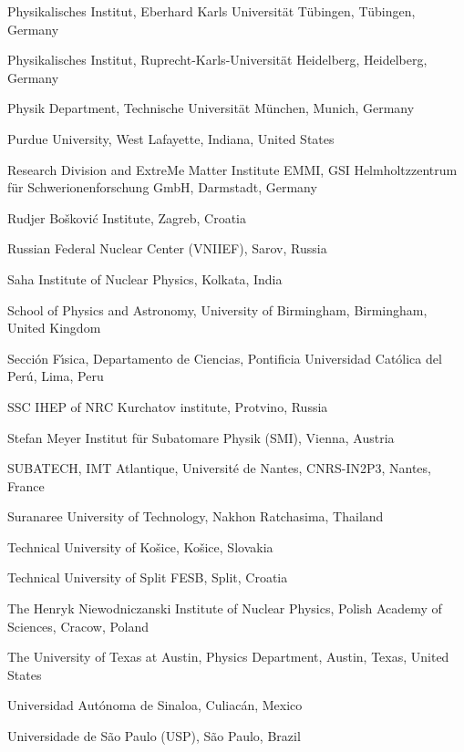 \begin{flushleft}
\begin{Authlist}
\item {}Physikalisches Institut, Eberhard Karls Universit\"{a}t T\"{u}bingen, T\"{u}bingen, Germany
\item {}Physikalisches Institut, Ruprecht-Karls-Universit\"{a}t Heidelberg, Heidelberg, Germany
\item {}Physik Department, Technische Universit\"{a}t M\"{u}nchen, Munich, Germany
\item {}Purdue University, West Lafayette, Indiana, United States
\item {}Research Division and ExtreMe Matter Institute EMMI, GSI Helmholtzzentrum f\"ur Schwerionenforschung GmbH, Darmstadt, Germany
\item {}Rudjer Bo\v{s}kovi\'{c} Institute, Zagreb, Croatia
\item {}Russian Federal Nuclear Center (VNIIEF), Sarov, Russia
\item {}Saha Institute of Nuclear Physics, Kolkata, India
\item {}School of Physics and Astronomy, University of Birmingham, Birmingham, United Kingdom
\item {}Secci\'{o}n F\'{\i}sica, Departamento de Ciencias, Pontificia Universidad Cat\'{o}lica del Per\'{u}, Lima, Peru
\item {}SSC IHEP of NRC Kurchatov institute, Protvino, Russia
\item {}Stefan Meyer Institut f\"{u}r Subatomare Physik (SMI), Vienna, Austria
\item {}SUBATECH, IMT Atlantique, Universit\'{e} de Nantes, CNRS-IN2P3, Nantes, France
\item {}Suranaree University of Technology, Nakhon Ratchasima, Thailand
\item {}Technical University of Ko\v{s}ice, Ko\v{s}ice, Slovakia
\item {}Technical University of Split FESB, Split, Croatia
\item {}The Henryk Niewodniczanski Institute of Nuclear Physics, Polish Academy of Sciences, Cracow, Poland
\item {}The University of Texas at Austin, Physics Department, Austin, Texas, United States
\item {}Universidad Aut\'{o}noma de Sinaloa, Culiac\'{a}n, Mexico
\item {}Universidade de S\~{a}o Paulo (USP), S\~{a}o Paulo, Brazil

\end{Authlist}
\end{flushleft}
